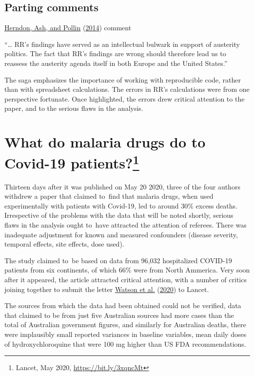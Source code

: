 \documentclass[
  10pt,
  b5paper]{book}
\begin{document}
\hypertarget{parting-comments}{%
\subsection*{Parting comments}\label{parting-comments}}

\protect\hyperlink{ref-herndon2014does}{Herndon, Ash, and Pollin} (\protect\hyperlink{ref-herndon2014does}{2014}) comment

``\ldots{} RR's findings have served as an intellectual bulwark in support of austerity politics. The fact that RR's findings are wrong should therefore lead us to reassess the austerity agenda itself in both Europe and the United States.''

The saga emphasizes the importance of working with reproducible code,
rather than with spreadsheet calculations.
The errors in RR's calculations were from one perspective fortunate.
Once highlighted, the errors drew critical attention to the paper,
and to the serious flaws in the analysis.

\hypertarget{sec:lancet}{%
\section[What do malaria drugs do to Covid-19 patients?]{\texorpdfstring{What do malaria drugs do to Covid-19 patients?\footnote{Lancet, May 2020, \url{https://bit.ly/3xqncMt}}}{What do malaria drugs do to Covid-19 patients?}}\label{sec:lancet}}

Thirteen days after it was published on May 20 2020, three of the
four authors withdrew a paper that claimed to~find that malaria drugs,
when used experimentally with patients with Covid-19, led to around
30\% excess deaths. Irrespective of the problems with the data that
will be noted shortly, serious flaws in the analysis ought to~have
attracted the attention of referees. There was inadequate
adjustment for known and measured confounders (disease severity,
temporal effects, site effects, dose used).

The study claimed to~be based on data from 96,032
hospitalized COVID-19 patients from six continents, of which 66\%
were from North Ammerica. Very soon after it appeared, the article
attracted critical attention, with a number of critics joining
together to submit the letter \protect\hyperlink{ref-watson2020open}{Watson et al.} (\protect\hyperlink{ref-watson2020open}{2020}) to Lancet.

The sources from which the data had been obtained could not be verified,
data that claimed to be from just five Australian sources had more
cases than the total of Australian government figures, and similarly
for Australian deaths, there were implausibly small reported variances
in baseline variables, mean daily doses of hydroxychloroquine that were
100 mg higher than US FDA recommendations.
\end{document}
